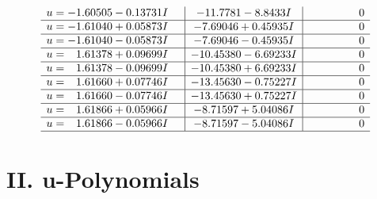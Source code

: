\documentclass[1p]{elsarticle_modified}
\theoremstyle{definition}
\begin{document}
$$\begin{array}{c|c|c}
\begin{aligned}
u &= -1.60505 - 0.13731 I\end{aligned}
 & -11.7781 - 8.8433 I & \phantom{-0.000000 } 0 \\ \hline\begin{aligned}
u &= -1.61040 + 0.05873 I\end{aligned}
 & -7.69046 + 0.45935 I & \phantom{-0.000000 } 0 \\ \hline\begin{aligned}
u &= -1.61040 - 0.05873 I\end{aligned}
 & -7.69046 - 0.45935 I & \phantom{-0.000000 } 0 \\ \hline\begin{aligned}
u &= \phantom{-}1.61378 + 0.09699 I\end{aligned}
 & -10.45380 - 6.69233 I & \phantom{-0.000000 } 0 \\ \hline\begin{aligned}
u &= \phantom{-}1.61378 - 0.09699 I\end{aligned}
 & -10.45380 + 6.69233 I & \phantom{-0.000000 } 0 \\ \hline\begin{aligned}
u &= \phantom{-}1.61660 + 0.07746 I\end{aligned}
 & -13.45630 - 0.75227 I & \phantom{-0.000000 } 0 \\ \hline\begin{aligned}
u &= \phantom{-}1.61660 - 0.07746 I\end{aligned}
 & -13.45630 + 0.75227 I & \phantom{-0.000000 } 0 \\ \hline\begin{aligned}
u &= \phantom{-}1.61866 + 0.05966 I\end{aligned}
 & -8.71597 + 5.04086 I & \phantom{-0.000000 } 0 \\ \hline\begin{aligned}
u &= \phantom{-}1.61866 - 0.05966 I\end{aligned}
 & -8.71597 - 5.04086 I & \phantom{-0.000000 } 0\\
 \hline 
 \end{array}$$\newpage
\newpage\renewcommand{\arraystretch}{1}
\centering \section*{ II. u-Polynomials}
\end{document}
